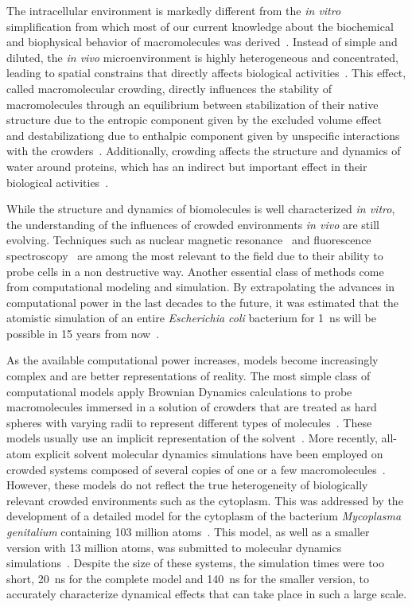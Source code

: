 \documentclass[journal=jacsat,manuscript=article]{achemso}
\begin{document}
The intracellular environment is markedly different from the \textit{in vitro} simplification from which most of our current knowledge about the biochemical and biophysical behavior of macromolecules was derived~\cite{Feig2017a}. Instead of simple and diluted, the \textit{in vivo} microenvironment is highly heterogeneous and concentrated, leading to spatial constrains that directly affects biological activities~\citep{ostrowska2019}. This effect, called macromolecular crowding, directly influences the stability of macromolecules through an equilibrium between stabilization of their native structure due to the entropic component given by the excluded volume effect~\cite{cheung2005} and destabilizationg due to enthalpic component given by unspecific interactions with the crowders~\cite{Feig2011,miklos2011,Wang2012b}. Additionally, crowding affects the structure and dynamics of water around proteins, which has an indirect but important effect in their biological activities~\cite{Harada2012a,king2013}.

While the structure and dynamics of biomolecules is well characterized \textit{in vitro}, the understanding of the influences of crowded environments \textit{in vivo} are still evolving.  Techniques such as nuclear magnetic resonance~\cite{reckel2007,pielak2008} and fluorescence spectroscopy~\cite{ignatova2004,xie2008,English2011} are among the most relevant to the field due to their ability to probe cells in a non destructive way. Another essential class of methods come from computational modeling and simulation. By extrapolating the advances in computational power in the last decades to the future, it was estimated that the atomistic simulation of an entire \textit{Escherichia coli} bacterium for \SI{1}{\nano\second} will be possible in 15 years from now~\cite{vanGunsteren2006a}.

As the available computational power increases, models become increasingly complex and are better representations of reality. The most simple class of computational models apply Brownian Dynamics calculations to probe macromolecules immersed in a solution of crowders that are treated as hard spheres with varying radii to represent different types of molecules~\cite{Ando2010}. These models usually use an implicit representation of the solvent~\cite{Mcguffee2010}. More recently, all-atom explicit solvent molecular dynamics simulations have been employed on crowded systems composed of several copies of one or a few macromolecules~\cite{Wang2017c}. However, these models do not reflect the true heterogeneity of biologically relevant crowded environments such as the cytoplasm. This was addressed by the development of a detailed model for the cytoplasm of the bacterium \textit{Mycoplasma genitalium} containing 103 million atoms~\cite{Feig2015}. This model, as well as a smaller version with 13 million atoms, was submitted to molecular dynamics simulations~\cite{Yu2016a}. Despite the size of these systems, the simulation times were too short, \SI{20}{\nano\second} for the complete model and \SI{140}{\nano\second} for the smaller version, to accurately characterize dynamical effects that can take place in such a large scale.
\end{document}
